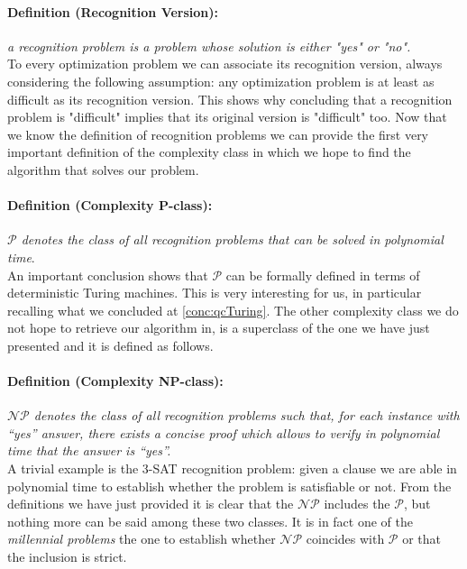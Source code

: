 \documentclass[english]{article}
\begin{document}
			\paragraph{Definition (Recognition Version):} \emph{a recognition problem is a problem whose solution is either "yes" or "no".} \\
			
			To every optimization problem we can associate its recognition version, always considering the following assumption: any optimization problem is at least as difficult as its recognition version. This shows why concluding that a recognition problem is "difficult" implies that its original version is "difficult" too. Now that we know the definition of recognition problems we can provide the first very important definition of the complexity class in which we hope to find the algorithm that solves our problem.
			
			\paragraph{Definition (Complexity P-class):} \emph{$\mathcal{P}$ denotes the class of all recognition problems that can be solved in polynomial time}. \\
			
			An important conclusion shows that $\mathcal{P}$ can be formally defined in terms of deterministic Turing machines. This is very interesting for us, in particular recalling what we concluded at \ref{conc:qcTuring}. The other complexity class we do not hope to retrieve our algorithm in,  is a superclass of the one we have just presented and it is defined as follows.
			
			\paragraph{Definition (Complexity NP-class):} \emph{$\mathcal{N}\mathcal{P}$ denotes the class of all recognition problems such that, for each instance with “yes” answer, there exists a concise proof which allows to verify in polynomial time that the answer is “yes”.} \\
		
			A trivial example is the 3-SAT recognition problem: given a clause we are able in polynomial time to establish whether the problem is satisfiable or not. From the definitions we have just provided it is clear that the $\mathcal{N}\mathcal{P}$ includes the $\mathcal{P}$, but nothing more can be said among these two classes. It is in fact one of the \emph{millennial problems} the one to establish whether $\mathcal{N}\mathcal{P}$ coincides with $\mathcal{P}$ or that the inclusion is strict. \\
			
\end{document}
